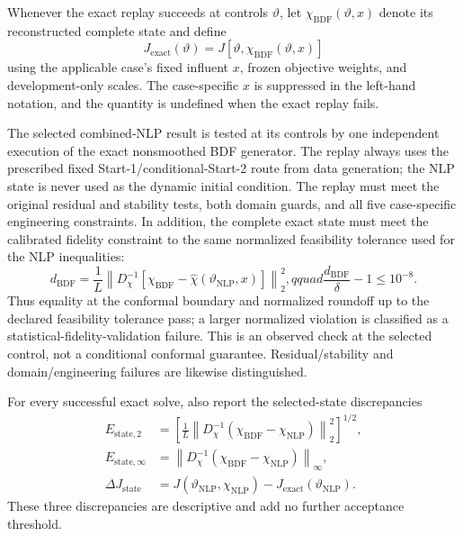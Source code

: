 \documentclass[a4paper,fleqn]{cas-sc}
\begin{document}
Whenever the exact replay succeeds at controls $\vartheta$, let $\chi_{\mathrm{BDF}}(\vartheta,x)$ denote its reconstructed complete state and define
\begin{equation}
\label{eq:exact_objective}
J_{\mathrm{exact}}(\vartheta)
=J[\vartheta,\chi_{\mathrm{BDF}}(\vartheta,x)]
\end{equation}
using the applicable case's fixed influent $x$, frozen objective weights, and
development-only scales. The case-specific $x$ is suppressed in the left-hand
notation, and the quantity is undefined when the exact replay fails.

The selected combined-NLP result is tested at its controls by one independent execution of the exact nonsmoothed BDF generator. The replay always uses the prescribed fixed Start-1/conditional-Start-2 route from data generation; the NLP state is never used as the dynamic initial condition. The replay must meet the original residual and stability tests, both domain guards, and all five case-specific engineering constraints. In addition, the complete exact state must meet the calibrated fidelity constraint to the same normalized feasibility tolerance used for the NLP inequalities:
\begin{equation}
\label{eq:exact_fidelity}
d_{\mathrm{BDF}}=
\frac1L\left\|D_\chi^{-1}
\left[\chi_{\mathrm{BDF}}-\widehat\chi(\vartheta_{\mathrm{NLP}},x)\right]\right\|_2^2
,qquad
\frac{d_{\mathrm{BDF}}}{\delta}-1\leq10^{-8}.
\end{equation}
Thus equality at the conformal boundary and normalized roundoff up to the declared feasibility tolerance pass; a larger normalized violation is classified as a statistical-fidelity-validation failure. This is an observed check at the selected control, not a conditional conformal guarantee. Residual/stability and domain/engineering failures are likewise distinguished.

For every successful exact solve, also report the selected-state discrepancies
\begin{equation}
\label{eq:exact_replay_discrepancy}
\begin{aligned}
E_{\mathrm{state},2}
&=\left[\frac1L\left\|D_\chi^{-1}
(\chi_{\mathrm{BDF}}-\chi_{\mathrm{NLP}})\right\|_2^2\right]^{1/2},\\
E_{\mathrm{state},\infty}
&=\left\|D_\chi^{-1}
(\chi_{\mathrm{BDF}}-\chi_{\mathrm{NLP}})\right\|_\infty,\\
\Delta J_{\mathrm{state}}
&=J(\vartheta_{\mathrm{NLP}},\chi_{\mathrm{NLP}})
-J_{\mathrm{exact}}(\vartheta_{\mathrm{NLP}}).
\end{aligned}
\end{equation}
These three discrepancies are descriptive and add no further acceptance threshold.
\end{document}
